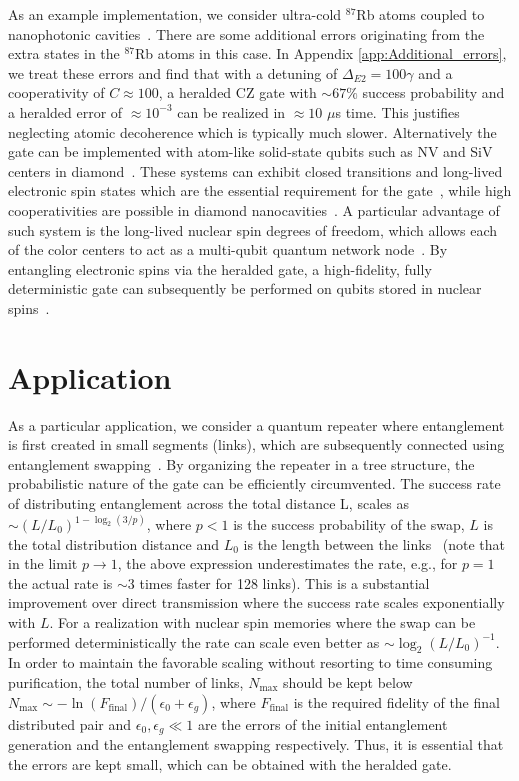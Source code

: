 As an example implementation, we consider ultra-cold ${}^{87}$Rb atoms coupled
to nanophotonic cavities~\cite{thompson,Tiecke}. There are some additional
errors originating from the extra states in the ${}^{87}$Rb atoms in this case.
In Appendix \ref{app:Additional_errors}, we treat these errors and find that with a detuning of
$\Delta_{E2}=100\gamma$ and a cooperativity of $C\approx100$, a heralded CZ gate
with $\sim67\%$ success probability and a heralded error of $\approx 10^{-3}$
can be realized in $\approx10$ $\mu$s time. This justifies neglecting atomic
decoherence which is typically much slower.
Alternatively the gate can be implemented with atom-like solid-state qubits such
as NV and SiV centers in diamond~\cite{phystoday}. These systems can exhibit
closed transitions and long-lived electronic spin states which are the essential
requirement for the gate~\cite{togan}, while high cooperativities are possible
in  diamond nanocavities~\cite{burek}. A particular advantage of such system is
the long-lived nuclear spin degrees of freedom, which allows each of the color
centers  to act as a multi-qubit quantum network node~\cite{maurer}.   By
entangling electronic spins via the heralded gate, a high-fidelity, fully
deterministic gate can subsequently be performed on qubits stored in nuclear
spins~\cite{Anders2prl}.

\section{Application}

As a particular application, we consider a quantum repeater where entanglement
is first created in small segments (links), which are subsequently connected
using entanglement swapping~\cite{briegel}. By organizing the repeater in a tree
structure, the probabilistic nature of the gate can be efficiently circumvented.
The success rate of distributing entanglement across the total distance L,
scales as $\sim (L/L_{0})^{1-\log_{2}(3/p)}$, where $p<1$ is the success
probability of the swap, $L$ is the total distribution distance and $L_{0}$ is
the length between the links~\cite{Borregaard2015b} (note that in the limit $p\to1$,
the above expression underestimates the rate, e.g., for $p=1$ the actual rate is
$\sim3$ times faster for 128 links). This is a substantial improvement over
direct transmission where the success rate scales exponentially with $L$. For a
realization with nuclear spin memories where the swap can be performed
deterministically the rate can scale even better as
$\sim\log_{2}(L/L_{0})^{-1}$. In order to maintain the favorable scaling without
resorting to time consuming purification, the total number of links,
$N_{\text{max}}$ should be kept below
$N_{\text{max}}\sim-\ln(F_{\text{final}})/(\epsilon_{0}+\epsilon_{g})$, where
$F_{\text{final}}$ is the required fidelity of the final distributed pair and
$\epsilon_{0},\epsilon_{g}\ll1$ are the errors of the initial entanglement
generation and the entanglement swapping respectively. Thus, it is essential
that the errors are kept small, which can be obtained with the heralded gate.

